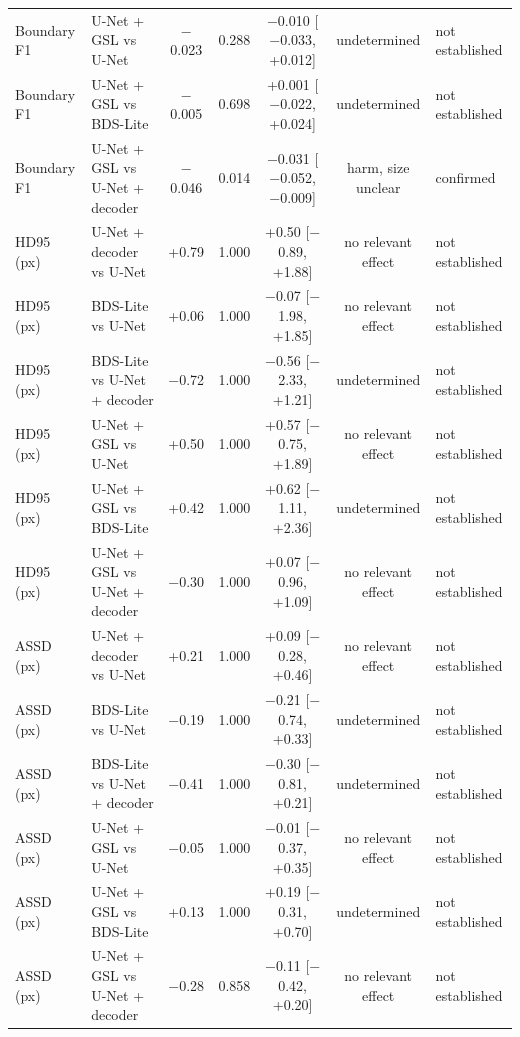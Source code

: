 \begin{tabular}{llccccl}
Boundary F1 & U-Net + GSL vs U-Net & $-$0.023 & 0.288 & $-$0.010 [$-$0.033, +0.012] & undetermined & not established \\
Boundary F1 & U-Net + GSL vs BDS-Lite & $-$0.005 & 0.698 & +0.001 [$-$0.022, +0.024] & undetermined & not established \\
Boundary F1 & U-Net + GSL vs U-Net + decoder & $-$0.046 & 0.014 & $-$0.031 [$-$0.052, $-$0.009] & harm, size unclear & confirmed \\
\midrule
HD95 (px) & U-Net + decoder vs U-Net & +0.79 & 1.000 & +0.50 [$-$0.89, +1.88] & no relevant effect & not established \\
HD95 (px) & BDS-Lite vs U-Net & +0.06 & 1.000 & $-$0.07 [$-$1.98, +1.85] & no relevant effect & not established \\
HD95 (px) & BDS-Lite vs U-Net + decoder & $-$0.72 & 1.000 & $-$0.56 [$-$2.33, +1.21] & undetermined & not established \\
HD95 (px) & U-Net + GSL vs U-Net & +0.50 & 1.000 & +0.57 [$-$0.75, +1.89] & no relevant effect & not established \\
HD95 (px) & U-Net + GSL vs BDS-Lite & +0.42 & 1.000 & +0.62 [$-$1.11, +2.36] & undetermined & not established \\
HD95 (px) & U-Net + GSL vs U-Net + decoder & $-$0.30 & 1.000 & +0.07 [$-$0.96, +1.09] & no relevant effect & not established \\
\midrule
ASSD (px) & U-Net + decoder vs U-Net & +0.21 & 1.000 & +0.09 [$-$0.28, +0.46] & no relevant effect & not established \\
ASSD (px) & BDS-Lite vs U-Net & $-$0.19 & 1.000 & $-$0.21 [$-$0.74, +0.33] & undetermined & not established \\
ASSD (px) & BDS-Lite vs U-Net + decoder & $-$0.41 & 1.000 & $-$0.30 [$-$0.81, +0.21] & undetermined & not established \\
ASSD (px) & U-Net + GSL vs U-Net & $-$0.05 & 1.000 & $-$0.01 [$-$0.37, +0.35] & no relevant effect & not established \\
ASSD (px) & U-Net + GSL vs BDS-Lite & +0.13 & 1.000 & +0.19 [$-$0.31, +0.70] & undetermined & not established \\
ASSD (px) & U-Net + GSL vs U-Net + decoder & $-$0.28 & 0.858 & $-$0.11 [$-$0.42, +0.20] & no relevant effect & not established \\
\bottomrule
\end{tabular}
